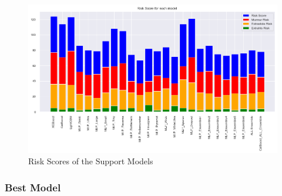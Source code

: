 \begin{figure}[H]
    \centering
    \includegraphics[width=\columnwidth]{../images/support_models_risk_scores.png}
    \caption{Risk Scores of the Support Models}
    \label{fig:support_models_risk_scores}
\end{figure}

\subsubsection*{Best Model}

